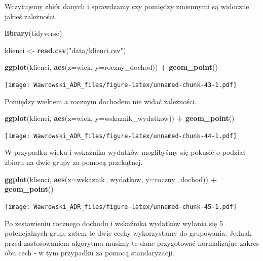 \documentclass[]{book}
\newenvironment{Shaded}{\begin{snugshade}}{\end{snugshade}}
\newcommand{\DataTypeTok}[1]{\textcolor[rgb]{0.13,0.29,0.53}{#1}}
\newcommand{\KeywordTok}[1]{\textcolor[rgb]{0.13,0.29,0.53}{\textbf{#1}}}
\newcommand{\NormalTok}[1]{#1}
\newcommand{\OperatorTok}[1]{\textcolor[rgb]{0.81,0.36,0.00}{\textbf{#1}}}
\newcommand{\StringTok}[1]{\textcolor[rgb]{0.31,0.60,0.02}{#1}}
\begin{document}
Wczytujemy zbiór danych i sprawdzamy czy pomiędzy zmiennymi są widoczne jakieś zależności.

\begin{Shaded}
\begin{Highlighting}[]
\KeywordTok{library}\NormalTok{(tidyverse)}

\NormalTok{klienci <-}\StringTok{ }\KeywordTok{read.csv}\NormalTok{(}\StringTok{"data/klienci.csv"}\NormalTok{)}

\KeywordTok{ggplot}\NormalTok{(klienci, }\KeywordTok{aes}\NormalTok{(}\DataTypeTok{x=}\NormalTok{wiek, }\DataTypeTok{y=}\NormalTok{roczny_dochod)) }\OperatorTok{+}
\StringTok{  }\KeywordTok{geom_point}\NormalTok{()}
\end{Highlighting}
\end{Shaded}

\texttt{[image: Wawrowski\_ADR\_files/figure-latex/unnamed-chunk-43-1.pdf]}

Pomiędzy wiekiem a rocznym dochodem nie widać zależności.

\begin{Shaded}
\begin{Highlighting}[]
\KeywordTok{ggplot}\NormalTok{(klienci, }\KeywordTok{aes}\NormalTok{(}\DataTypeTok{x=}\NormalTok{wiek, }\DataTypeTok{y=}\NormalTok{wskaznik_wydatkow)) }\OperatorTok{+}
\StringTok{  }\KeywordTok{geom_point}\NormalTok{()}
\end{Highlighting}
\end{Shaded}

\texttt{[image: Wawrowski\_ADR\_files/figure-latex/unnamed-chunk-44-1.pdf]}

W przypadku wieku i wskaźnika wydatków moglibyśmy się pokusić o podział zbioru na dwie grupy za pomocą przekątnej.

\begin{Shaded}
\begin{Highlighting}[]
\KeywordTok{ggplot}\NormalTok{(klienci, }\KeywordTok{aes}\NormalTok{(}\DataTypeTok{x=}\NormalTok{wskaznik_wydatkow, }\DataTypeTok{y=}\NormalTok{roczny_dochod)) }\OperatorTok{+}
\StringTok{  }\KeywordTok{geom_point}\NormalTok{()}
\end{Highlighting}
\end{Shaded}

\texttt{[image: Wawrowski\_ADR\_files/figure-latex/unnamed-chunk-45-1.pdf]}

Po zestawieniu rocznego dochodu i wskaźnika wydatków wyłania się 5 potencjalnych grup, zatem te dwie cechy wykorzystamy do grupowania. Jednak przed zastosowaniem algorytmu musimy te dane przygotować normalizując zakres obu cech - w tym przypadku za pomocą standaryzacji.
\end{document}
